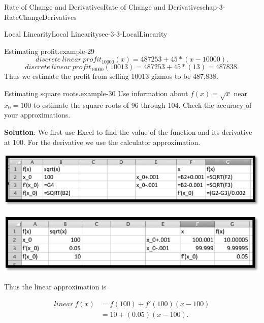\documentclass[oneside,10pt,]{book}
\newcommand{\terminology}[1]{\textbf{#1}}
\numberwithin{equation}{section}
\newcommand{\amp}{&}
\begin{document}
\begin{chapterptx}{Rate of Change and Derivatives}{}{Rate of Change and Derivatives}{}{}{chap-3-RateChangeDerivatives}
\begin{sectionptx}{Local Linearity}{}{Local Linearity}{}{}{sec-3-3-LocalLinearity}
\begin{example}{Estimating profit.}{example-29}
\begin{equation*}
discrete\ linear\ profit_{10000} (x)=487253+45*(x-10000).
\end{equation*}
%
\begin{equation*}
discrete\ linear\ profit_{10000} (10013)=487253+45*(13)=487838.
\end{equation*}
\hypertarget{p-1142}{}%
Thus we estimate the profit from selling 10013 gizmos to be \textdollar{}487,838.%
\end{example}
\begin{example}{Estimating square roots.}{example-30}%
\hypertarget{p-1143}{}%
Use information about \(f(x)=\sqrt{x}\) near \(x_0=100\) to estimate the square roots of 96 through 104.  Check the accuracy of your approximations.%
\par
\hypertarget{p-1144}{}%
\terminology{Solution}:  We first use Excel to find the value of the function and its derivative at 100.  For the derivative we use the calculator approximation.%
\begin{sidebyside}{1}{0.1}{0.1}{0}%
\begin{sbspanel}{0.8}%
\includegraphics[width=1\linewidth]{images/sec3-3-3.png}
\end{sbspanel}%
\end{sidebyside}%
\begin{sidebyside}{1}{0.1}{0.1}{0}%
\begin{sbspanel}{0.8}%
\includegraphics[width=1\linewidth]{images/sec3-3-4.png}
\end{sbspanel}%
\end{sidebyside}%
\par
\hypertarget{p-1145}{}%
Thus the linear approximation is%
\par
\hypertarget{p-1146}{}%
%
\begin{equation*}
\begin{aligned} linear\ f(x) \amp = 
f(100)+f'(100)(x-100) \\ 
\amp =10+(0.05)(x-100). \end{aligned}

\end{equation*}
\end{example}
\end{sectionptx}
\end{chapterptx}
\end{document}
